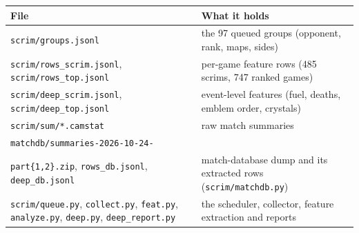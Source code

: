 \documentclass[11pt,a4paper]{article}
\begin{document}
\begin{table}[H]
\centering\small
\begin{tabularx}{\linewidth}{>{\raggedright\arraybackslash}p{7.2cm}X}
\toprule
File & What it holds \\
\midrule
\texttt{scrim/groups.jsonl} & the 97 queued groups (opponent, rank, maps, sides) \\
\texttt{scrim/rows\_scrim.jsonl}, \texttt{scrim/rows\_top.jsonl} & per-game feature rows (485 scrims, 747 ranked games) \\
\texttt{scrim/deep\_scrim.jsonl}, \texttt{scrim/deep\_top.jsonl} & event-level features (fuel, deaths, emblem order, crystals) \\
\texttt{scrim/sum/*.camstat} & raw match summaries \\
\texttt{matchdb/summaries-2026-10-24-}\\\texttt{part\{1,2\}.zip}, \texttt{rows\_db.jsonl}, \texttt{deep\_db.jsonl} & match-database dump and its extracted rows (\texttt{scrim/matchdb.py}) \\
\texttt{scrim/queue.py}, \texttt{collect.py}, \texttt{feat.py}, \texttt{analyze.py}, \texttt{deep.py}, \texttt{deep\_report.py} & the scheduler, collector, feature extraction and reports \\
\bottomrule
\end{tabularx}
\end{table}
\end{document}
